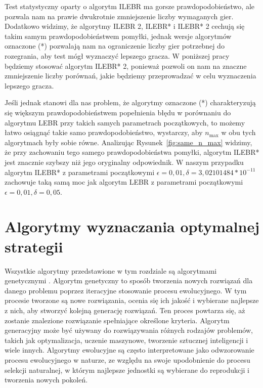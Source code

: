 \documentclass[inzynierska]{pwr_wmat_praca_dyplomowa}
\theoremstyle{plain}
\numberwithin{theorem}{chapter}
\theoremstyle{definition}
\numberwithin{theorem}{chapter}
\newcommand{\nmax}{n_{\text{max}}}
\begin{document}
	Test statystyczny oparty o algorytm ILEBR ma gorsze prawdopodobieństwo, ale pozwala nam na prawie dwukrotnie zmniejszenie liczby wymaganych gier. Dodatkowo widzimy, że algorytmy  ILEBR 2, ILEBR* i ILEBR* 2 cechują się takim samym prawdopodobieństwem pomyłki, jednak wersje algorytmów oznaczone (*) pozwalają nam na ograniczenie liczby gier potrzebnej do rozegrania, aby test mógł wyznaczyć lepszego gracza. W poniższej pracy będziemy stosować algorytm ILEBR* 2, ponieważ pozwoli on nam na znaczne zmniejszenie liczby porównań, jakie będziemy przeprowadzać w celu wyznaczenia lepszego gracza. 
	
	Jeśli jednak stanowi dla nas problem, że algorytmy oznaczone (*) charakteryzują się większym prawdopodobieństwem popełnienia błędu w porównaniu do algorytmu LEBR przy takich samych parametrach początkowych, to możemy łatwo osiągnąć takie samo prawdopodobieństwo, wystarczy, aby $\nmax$ w obu tych algorytmach były sobie równe.
	Analizując Rysunek~\ref{fig:same_n_max} widzimy, że przy zachowaniu tego samego prawdopodobieństwa pomyłki, algorytm ILEBR* jest znacznie szybszy niż jego oryginalny odpowiednik. W naszym przypadku algorytm ILEBR* z parametrami początkowymi $\epsilon =0,01, \delta =3,02101484*10^{-11}$ zachowuje taką samą moc jak algorytm LEBR z parametrami początkowymi $\epsilon=0,01, \delta=0,05$.

	
	
	\chapter{Algorytmy wyznaczania optymalnej strategii}
	Wszystkie algorytmy przedstawione w tym rozdziale są algorytmami genetycznymi \cite{Figielska2006}. 
	Algorytm genetyczny to sposób tworzenia nowych rozwiązań dla danego problemu poprzez iteracyjne stosowanie procesu ewolucyjnego. W tym procesie tworzone są nowe rozwiązania, ocenia się ich jakość i wybierane najlepsze z nich, aby stworzyć kolejną generację rozwiązań. Ten proces powtarza się, aż zostanie znalezione rozwiązanie spełniające określone kryteria. Algorytm generacyjny może być używany do rozwiązywania różnych rodzajów problemów, takich jak optymalizacja, uczenie maszynowe, tworzenie sztucznej inteligencji i wiele innych. Algorytmy ewolucyjne są często interpretowane jako odwzorowanie procesu ewolucyjnego w naturze, ze względu na swoje upodobnienie do procesu selekcji naturalnej, w którym najlepsze jednostki są wybierane do reprodukcji i tworzenia nowych pokoleń.
	
\end{document}
